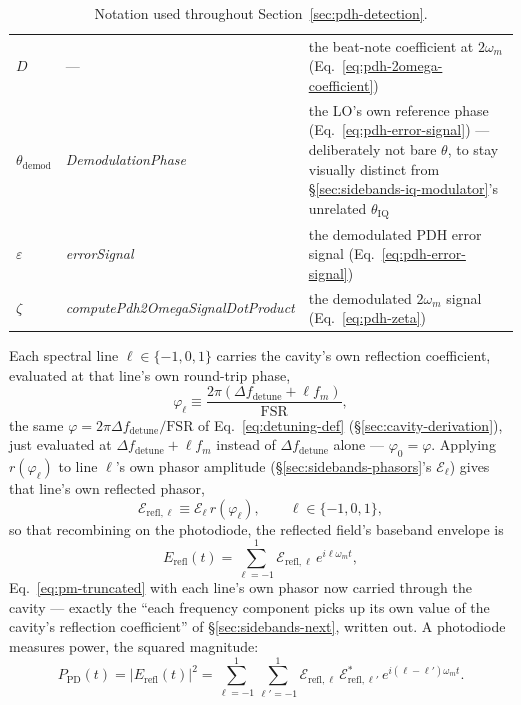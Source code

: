 \documentclass[9pt]{article}
\begin{document}
\begin{table}[H]
\begin{tabular}{@{}llp{7cm}@{}}
$D$ & --- & the beat-note coefficient at $2\omega_m$ (Eq.~\eqref{eq:pdh-2omega-coefficient}) \\
$\theta_{\mathrm{demod}}$ & \textit{DemodulationPhase} & the LO's own reference phase (Eq.~\eqref{eq:pdh-error-signal}) --- deliberately not bare $\theta$, to stay visually distinct from \S\ref{sec:sidebands-iq-modulator}'s unrelated $\theta_{\mathrm{IQ}}$ \\
$\varepsilon$ & \textit{errorSignal} & the demodulated PDH error signal (Eq.~\eqref{eq:pdh-error-signal}) \\
$\zeta$ & \textit{computePdh2OmegaSignalDotProduct} & the demodulated $2\omega_m$ signal (Eq.~\eqref{eq:pdh-zeta}) \\
\bottomrule
\end{tabular}
\caption{Notation used throughout Section~\ref{sec:pdh-detection}.}
\label{tab:pdh-glossary}
\end{table}
Each spectral line $\ell\in\{-1,0,1\}$ carries the cavity's own reflection
coefficient, evaluated at that line's own round-trip phase,
\begin{equation}
\varphi_\ell \equiv \frac{2\pi\left(\Delta f_{\mathrm{detune}} + \ell f_m\right)}{\mathrm{FSR}},
\label{eq:pdh-phi-ell}
\end{equation}
the same $\varphi=2\pi\Delta f_{\mathrm{detune}}/\mathrm{FSR}$ of
Eq.~\eqref{eq:detuning-def} (\S\ref{sec:cavity-derivation}), just evaluated
at $\Delta f_{\mathrm{detune}}+\ell f_m$ instead of $\Delta f_{\mathrm{detune}}$
alone --- $\varphi_0=\varphi$. Applying $r(\varphi_\ell)$ to line $\ell$'s
own phasor amplitude (\S\ref{sec:sidebands-phasors}'s $\mathcal{E}_\ell$)
gives that line's own reflected phasor,
\begin{equation}
\mathcal{E}_{\mathrm{refl},\ell} \equiv \mathcal{E}_\ell\, r(\varphi_\ell), \qquad \ell\in\{-1,0,1\},
\label{eq:pdh-reflected-phasor}
\end{equation}
so that recombining on the photodiode, the reflected field's baseband
envelope is
\begin{equation}
E_{\mathrm{refl}}(t) = \sum_{\ell=-1}^{1} \mathcal{E}_{\mathrm{refl},\ell}\, e^{i\ell\omega_m t},
\label{eq:pdh-reflected-field}
\end{equation}
Eq.~\eqref{eq:pm-truncated} with each line's own phasor now carried through
the cavity --- exactly the ``each frequency component picks up its own
value of the cavity's reflection coefficient'' of
\S\ref{sec:sidebands-next}, written out. A photodiode measures power, the
squared magnitude:
\begin{equation}
P_{\mathrm{PD}}(t) = \left|E_{\mathrm{refl}}(t)\right|^2 = \sum_{\ell=-1}^{1}\sum_{\ell'=-1}^{1} \mathcal{E}_{\mathrm{refl},\ell}\,\mathcal{E}_{\mathrm{refl},\ell'}^*\, e^{i(\ell-\ell')\omega_m t}.
\label{eq:pdh-photodiode-power}
\end{equation}
\end{document}
